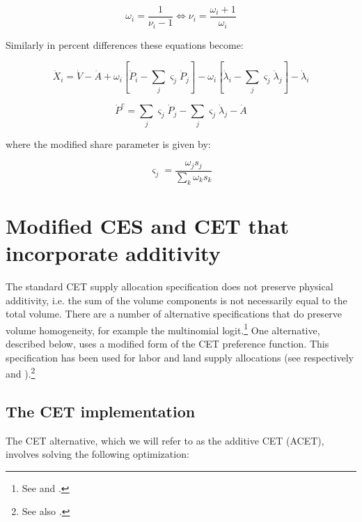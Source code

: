 \begin{displaymath}
\omega_i = \frac{1}{\nu_i-1} \iff \nu_i = \frac{\omega_i + 1}{\omega_i}
\end{displaymath}

Similarly in percent differences these equations become:

\begin{equation}
\label{eq:crethxlin}
\dot X_i = \dot V - \dot A
	+\omega_i \left[\dot P_i - \sum_j{\varsigma_j\dot P_j} \right]
	- \omega_i \left[ \dot \lambda_i - \sum_j{\varsigma_j\dot \lambda_j}\right]
	- \dot \lambda_i
\end{equation}

\begin{equation}
\label{eq:crethduallin}
\dot P^c = \sum_j {\varsigma_j \dot P_j} - \sum_j {\varsigma_j \dot \lambda_j} - \dot A
\end{equation}

\noindent where the modified share parameter is given by:

\begin{equation}
\label{eq:crethadj}
\varsigma_j = \frac{\omega_j s_j} {\sum_k{\omega_k s_k}}
\end{equation}

\fi

\section{Modified CES and CET that incorporate additivity}

The standard CET supply allocation specification does not preserve physical
additivity, i.e. the sum of the volume components is not necessarily equal to
the total volume. There are a number of alternative specifications that do
preserve volume homogeneity, for example the multinomial logit.\footnote{See \cite{FujimorietalFoodSec2014}
and \cite{GCAM2011a}.}
One alternative, described below, uses a modified form of the CET preference
function. This specification has been used for
labor and land supply allocations (see respectively \cite{DixonRimmer2006ER}
and \cite{Gieseckeetal2013JDS}).\footnote{See also \cite{DvdMPetersGTWP2020}.}

\subsection{The CET implementation}

The CET alternative, which we will refer to as the additive CET (ACET), involves solving the following optimization:

